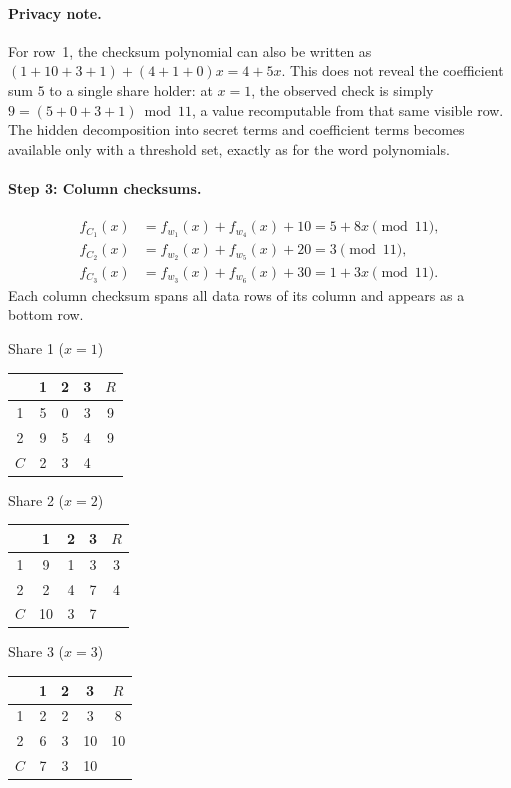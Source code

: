 \documentclass[11pt]{article}
\begin{document}
\paragraph{Privacy note.}
For row~1, the checksum polynomial can also be written as $(1+10+3+1)+(4+1+0)x = 4+5x$. This does not reveal the coefficient sum $5$ to a single share holder: at $x=1$, the observed check is simply $9=(5+0+3+1)\bmod 11$, a value recomputable from that same visible row. The hidden decomposition into secret terms and coefficient terms becomes available only with a threshold set, exactly as for the word polynomials.

\paragraph{Step 3: Column checksums.}
\begin{align*}
f_{C_1}(x) &= f_{w_1}(x)+f_{w_4}(x)+10
           = 5 + 8x \pmod{11}, \\
f_{C_2}(x) &= f_{w_2}(x)+f_{w_5}(x)+20
           = 3 \pmod{11}, \\
f_{C_3}(x) &= f_{w_3}(x)+f_{w_6}(x)+30
           = 1 + 3x \pmod{11}.
\end{align*}
Each column checksum spans all data rows of its column and appears as a bottom row.

\begin{center}
\small
\begin{minipage}[t]{0.3\linewidth}
\centering
Share 1 ($x=1$)\\[4pt]
\begin{tabular}{@{}c|ccc|c@{}}
\toprule
 & 1 & 2 & 3 & $R$ \\ \midrule
1 & 5 & 0 & 3 & 9 \\
2 & 9 & 5 & 4 & 9 \\ \midrule
$C$ & 2 & 3 & 4 & \\
\bottomrule
\end{tabular}
\end{minipage}%
\hfill
\begin{minipage}[t]{0.3\linewidth}
\centering
Share 2 ($x=2$)\\[4pt]
\begin{tabular}{@{}c|ccc|c@{}}
\toprule
 & 1 & 2 & 3 & $R$ \\ \midrule
1 & 9 & 1 & 3 & 3 \\
2 & 2 & 4 & 7 & 4 \\ \midrule
$C$ & 10 & 3 & 7 & \\
\bottomrule
\end{tabular}
\end{minipage}%
\hfill
\begin{minipage}[t]{0.3\linewidth}
\centering
Share 3 ($x=3$)\\[4pt]
\begin{tabular}{@{}c|ccc|c@{}}
\toprule
 & 1 & 2 & 3 & $R$ \\ \midrule
1 & 2 & 2 & 3 & 8 \\
2 & 6 & 3 & 10 & 10 \\ \midrule
$C$ & 7 & 3 & 10 & \\
\bottomrule
\end{tabular}
\end{minipage}
\end{center}
\end{document}

